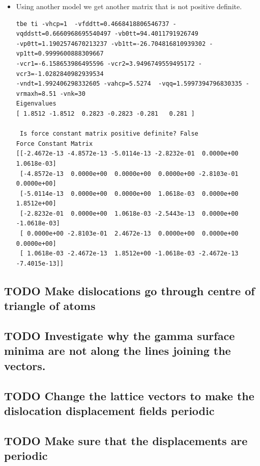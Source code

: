 \documentclass[11pt]{article}
\begin{document}
\begin{itemize}
\begin{verbatim}
\end{verbatim}

\item Using another model we get another matrix that is not positive
definite. 
\begin{verbatim}
tbe ti -vhcp=1  -vfddtt=0.4668418806546737 -vqddstt=0.6660968695540497 -vb0tt=94.4011791926749 
-vp0tt=1.1902574670213237 -vb1tt=-26.704816810939302 -vp1tt=0.9999600888309667 
-vcr1=-6.158653986495596 -vcr2=3.9496749559495172 -vcr3=-1.0282840982939534 
-vndt=1.992406298332605 -vahcp=5.5274  -vqq=1.5997394796830335 -vrmaxh=8.51 -vnk=30 
Eigenvalues
[ 1.8512 -1.8512  0.2823 -0.2823 -0.281   0.281 ]

 Is force constant matrix positive definite? False
Force Constant Matrix
[[-2.4672e-13 -4.8572e-13 -5.0114e-13 -2.8232e-01  0.0000e+00  1.0618e-03]
 [-4.8572e-13  0.0000e+00  0.0000e+00  0.0000e+00 -2.8103e-01  0.0000e+00]
 [-5.0114e-13  0.0000e+00  0.0000e+00  1.0618e-03  0.0000e+00  1.8512e+00]
 [-2.8232e-01  0.0000e+00  1.0618e-03 -2.5443e-13  0.0000e+00 -1.0618e-03]
 [ 0.0000e+00 -2.8103e-01  2.4672e-13  0.0000e+00  0.0000e+00  0.0000e+00]
 [ 1.0618e-03 -2.4672e-13  1.8512e+00 -1.0618e-03 -2.4672e-13 -7.4015e-13]]
\end{verbatim}
\end{itemize}

\subsection{{\bfseries\sffamily TODO} Make dislocations go through centre of triangle of atoms}
\label{sec:orga9d5563}

\subsection{{\bfseries\sffamily TODO} Investigate why the gamma surface minima are not along the lines joining the vectors.}
\label{sec:orgb65c79f}

\subsection{{\bfseries\sffamily TODO} Change the lattice vectors to make the dislocation displacement fields periodic}
\label{sec:orgd69475b}
\subsection{{\bfseries\sffamily TODO} Make sure that the displacements are periodic}
\label{sec:org9a85504}
\end{document}
